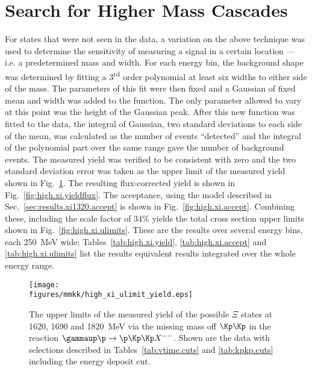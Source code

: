 \section{\label{sec:results.xiulimit}Search for Higher Mass Cascades}

For states that were not seen in the data, a variation on the above technique was used to determine the sensitivity of measuring a signal in a certain location --- i.e. a predetermined mass and width. For each energy bin, the background shape was determined by fitting a 3\textsuperscript{rd} order polynomial at least six widths to either side of the mass. The parameters of this fit were then fixed and a Gaussian of fixed mean and width was added to the function. The only parameter allowed to vary at this point was the height of the Gaussian peak. After this new function was fitted to the data, the integral of Gaussian, two standard deviations to each side of the mean, was calculated as the number of events ``detected'' and the integral of the polynomial part over the same range gave the number of background events. The measured yield was verified to be consistent with zero and the two standard deviation error was taken as the upper limit of the measured yield shown in Fig.~\ref{fig:high.xi.yield}. The resulting flux-corrected yield is shown in Fig.~\ref{fig:high.xi.yieldflux}. The acceptance, using the model described in Sec.~\ref{sec:results.xi1320.accept} is shown in Fig.~\ref{fig:high.xi.accept}. Combining these, including the scale factor of 34\% yields the total cross section upper limits shown in Fig.~\ref{fig:high.xi.ulimits}. These are the results over several energy bins, each 250~MeV wide; Tables~\ref{tab:high.xi.yield}, \ref{tab:high.xi.accept} and \ref{tab:high.xi.ulimits} list the results equivalent results integrated over the whole energy range.





\begin{figure}[bhp]\centering
    \texttt{[image: \\figures/mmkk/high\_xi\_ulimit\_yield.eps]}
    \caption[Higher Mass \texorpdfstring{$\Xi^*$}{Xi*} Measured Yield Upper Limits]{\label{fig:high.xi.yield}The upper limits of the measured yield of the possible $\Xi$ states at 1620, 1690 and 1820~MeV via the missing mass off $\Kp\Kp$ in the reaction $\gammaup \p \rightarrow \p \Kp \Kp X^{--}$. Shown are the data with selections described in Tables~\ref{tab:vtime.cuts} and \ref{tab:kpkp.cuts} including the  energy deposit cut.}
\end{figure}

